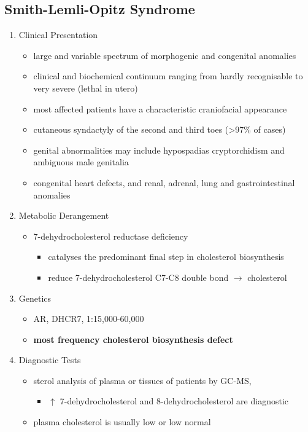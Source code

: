 \documentclass{scrartcl}
\begin{document}
\subsection{Smith-Lemli-Opitz Syndrome}
\label{sec:org1a6a11f}
\begin{enumerate}
\item Clinical Presentation
\label{sec:org799605e}
\begin{itemize}
\item large and variable spectrum of morphogenic and congenital anomalies
\item clinical and biochemical continuum ranging from hardly recognisable
to very severe (lethal in utero)
\item most affected patients have a characteristic craniofacial appearance
\item cutaneous syndactyly of the second and third toes (>97\% of cases)
\item genital abnormalities may include hypospadias cryptorchidism and
ambiguous male genitalia
\item congenital heart defects, and renal, adrenal, lung and
gastrointestinal anomalies
\end{itemize}

\item Metabolic Derangement
\label{sec:org9037a6b}
\begin{itemize}
\item 7-dehydrocholesterol reductase deficiency
\begin{itemize}
\item catalyses the predominant final step in cholesterol biosynthesis
\item reduce 7-dehydrocholesterol C7-C8 double bond \(\to\) cholesterol
\end{itemize}
\end{itemize}

\item Genetics
\label{sec:orgf8f6005}
\begin{itemize}
\item AR, DHCR7, 1:15,000-60,000
\item \textbf{most frequency cholesterol biosynthesis defect}
\end{itemize}

\item Diagnostic Tests
\label{sec:org37d1cc4}
\begin{itemize}
\item sterol analysis of plasma or tissues of patients by GC-MS,
\begin{itemize}
\item \(\uparrow\) 7-dehydrocholesterol and 8-dehydrocholesterol are diagnostic
\end{itemize}
\item plasma cholesterol is usually low or low normal
\end{itemize}


\end{enumerate}
\end{document}
